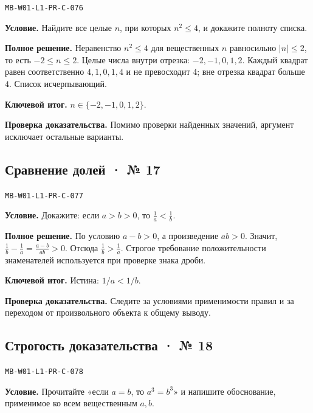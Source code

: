 \documentclass[11pt,a4paper,openany]{book}
\newcommand{\muid}[1]{\texttt{\footnotesize #1}}
\begin{document}
\muid{MB-W01-L1-PR-C-076}\par

\textbf{Условие.} Найдите все целые $n$, при которых $n^2\le4$, и докажите полноту списка.\par

\textbf{Полное решение.} Неравенство $n^2\le4$ для вещественных $n$ равносильно $|n|\le2$, то есть $-2\le n\le2$. Целые числа внутри отрезка: $-2,-1,0,1,2$. Каждый квадрат равен соответственно $4,1,0,1,4$ и не превосходит $4$; вне отрезка квадрат больше $4$. Список исчерпывающий.


\begin{learnbox}\textbf{Ключевой итог.} $n\in\{-2,-1,0,1,2\}$.\par \textbf{Проверка доказательства.} 
Помимо проверки найденных значений, аргумент исключает остальные варианты. 
\end{learnbox}

\subsection*{Сравнение долей · № 17}\hypertarget{solution:MB-W01-L1-PR-C-077}{}

\muid{MB-W01-L1-PR-C-077}\par

\textbf{Условие.} Докажите: если $a>b>0$, то $\frac1a<\frac1b$.\par

\textbf{Полное решение.} По условию $a-b>0$, а произведение $ab>0$. Значит, $\frac1b-\frac1a=\frac{a-b}{ab}>0$. Отсюда $\frac1b>\frac1a$. Строгое требование положительности знаменателей используется при проверке знака дроби.


\begin{learnbox}\textbf{Ключевой итог.} Истина: $1/a<1/b$.\par \textbf{Проверка доказательства.} 
Следите за условиями применимости правил и за переходом от произвольного объекта к общему выводу. 
\end{learnbox}

\subsection*{Строгость доказательства · № 18}\hypertarget{solution:MB-W01-L1-PR-C-078}{}

\muid{MB-W01-L1-PR-C-078}\par

\textbf{Условие.} Прочитайте «если $a=b$, то $a^3=b^3$» и напишите обоснование, применимое ко всем вещественным $a,b$.\par
\end{document}
